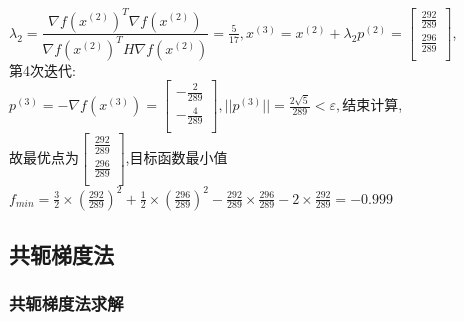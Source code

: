 \begin{solution}
    $\lambda_2=\dfrac{\nabla f(x^{(2)})^T\nabla f(x^{(2)})}{\nabla f(x^{(2)})^TH\nabla f(x^{(2)})}=\frac{5}{17},x^{(3)}=x^{(2)}+\lambda_2p^{(2)}=\begin{bmatrix} \frac{292}{289}\\\frac{296}{289}\\\end{bmatrix}$,\\
    第4次迭代:\\
    $p^{(3)}=-\nabla f(x^{(3)})=\begin{bmatrix} -\frac{2}{289}\\-\frac{4}{289}\\\end{bmatrix},||p^{(3)}||=\frac{2\sqrt{5}}{289}<\varepsilon,\text{结束计算}$,\\
    故最优点为$\begin{bmatrix} \frac{292}{289}\\\frac{296}{289}\\\end{bmatrix}$,目标函数最小值$f_{min}=\frac{3}{2}\times(\frac{292}{289})^2+\frac{1}{2}\times(\frac{296}{289})^2-\frac{292}{289}\times\frac{296}{289}-2\times\frac{292}{289}=-0.999$
\end{solution}

\subsection{共轭梯度法}

\subsubsection{共轭梯度法求解}

